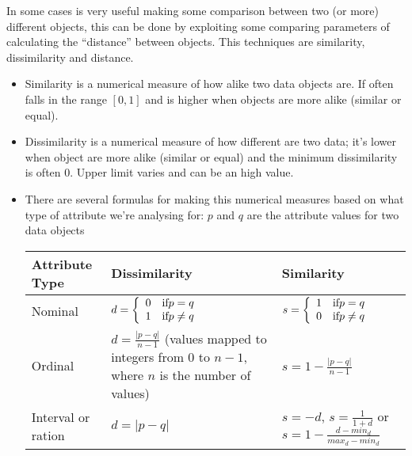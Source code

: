 In some cases is very useful making some comparison between two (or more) different objects, this can be done by exploiting some comparing parameters of calculating the ``distance'' between objects.
This techniques are similarity, dissimilarity and distance.
\begin{itemize}
	\item Similarity is a numerical measure of how alike two data objects are.
	If often falls in the range $[0,1]$ and is higher when objects are more alike (similar or equal).
	\item Dissimilarity is a numerical measure of how different are two data; it's lower when object are more alike (similar or equal) and the minimum dissimilarity is often 0.
	Upper limit varies and can be an high value.
	\item There are several formulas for making this numerical measures based on what type of attribute we're analysing for: $p$ and $q$ are the attribute values for two data objects
	\begin{table}[h]
		\centering
		\begin{tabular}{l|l|l}
			Attribute Type & Dissimilarity & Similarity \\ \hline
			Nominal & $d = \left\{ \begin{array}{l l} 0 \quad \text{if} p = q \\ 1 \quad \text{if} p \neq q \end{array} \right.$ & $s = \left\{ \begin{array}{l l} 1 \quad \text{if} p = q \\ 0 \quad \text{if} p \neq q \end{array} \right.$ \\ \hline
			Ordinal & \parbox[l]{5cm}{$d = \frac{|p - q|}{n - 1}$\\(values mapped to integers\\from $0$ to $n-1$,\\where $n$ is the\\number of values)} & $s = 1 - \frac{|p - q|}{n - 1}$ \\ \hline
			Interval or ration & $d = |p - q|$ & \parbox[lc]{5cm}{$s = -d$, $s = \frac{1}{1 + d}$ or\\$s = 1 - \frac{d - min_d}{max_d - min_d}$}
		\end{tabular}
	\end{table}
\end{itemize}

